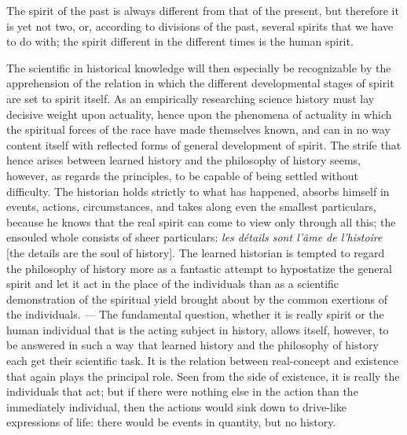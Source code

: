 \documentclass[12pt]{book}
\begin{document}
The spirit of the past is always different from that of the present, but therefore it is yet
not two, or, according to divisions of the past, several spirits that we have to do with; the
spirit different in the different times is the human spirit.

The scientific in historical knowledge will then especially be recognizable by the
apprehension of the relation in which the different developmental stages of spirit are set to
spirit itself. As an empirically researching science history must lay decisive weight upon
actuality, hence upon the phenomena of actuality in which the spiritual forces of the race have
made themselves known, and can in no way content itself with reflected forms of general
development of spirit. The strife that hence arises between learned history and the philosophy
of history seems, however, as regards the principles, to be capable of being settled without
difficulty. The historian holds strictly to what has happened, absorbs himself in events,
actions, circumstances, and takes along even the smallest particulars, because he knows that
the real spirit can come to view only through all this; the ensouled whole consists of sheer
particulars: \textit{les détails sont l'âme de l'histoire} [the details are the soul of
history]. The learned historian is tempted to regard the philosophy of history more as a
fantastic attempt to hypostatize the general spirit and let it act in the place of the
individuals than as a scientific demonstration of the spiritual yield brought about by the
common exertions of the individuals. --- The fundamental question, whether it is really spirit
or the human individual that is the acting subject in history, allows itself, however, to be
answered in such a way that learned history and the philosophy of history each get their
scientific task. It is the relation between real-concept and existence that again plays the
principal role. Seen from the side of existence, it is really the individuals that act; but if
there were nothing else in the action than the immediately individual, then the actions would
sink down to drive-like expressions of life: there would be events in quantity, but no history.
\end{document}
